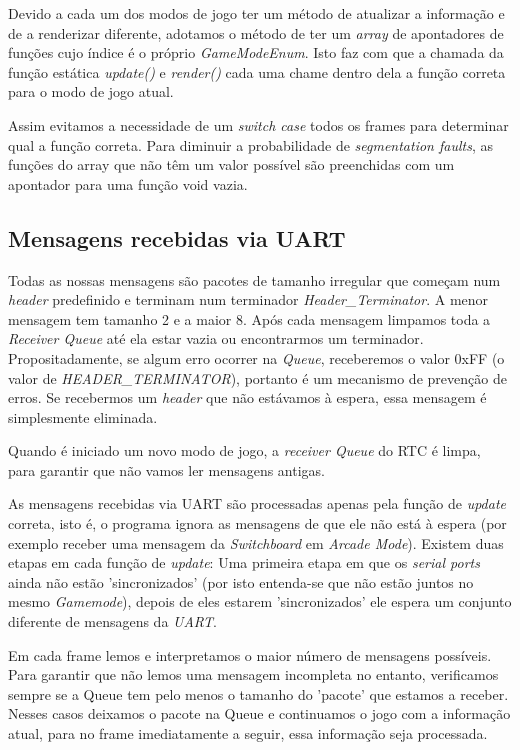 \documentclass{report}
\begin{document}
Devido a cada um dos modos de jogo ter um método de atualizar a informação e de a renderizar diferente, adotamos o método de ter um \textit{array} de apontadores de funções cujo índice é o próprio \textit{GameModeEnum}. Isto faz com que a chamada da função estática \textit{update()} e \textit{render()} cada uma chame dentro dela a função correta para o modo de jogo atual.

Assim evitamos a necessidade de um \textit{switch case} todos os frames para determinar qual a função correta. Para diminuir a probabilidade de \textit{segmentation faults}, as funções do array que não têm um valor possível são preenchidas com um apontador para uma função void vazia.

\subsection{Mensagens recebidas via UART}

Todas as nossas mensagens são pacotes de tamanho irregular que começam num \textit{header} predefinido e terminam num terminador \textit{Header\_Terminator}. A menor mensagem tem tamanho 2 e a maior 8. Após cada mensagem limpamos toda a \textit{Receiver Queue} até ela estar vazia ou encontrarmos um terminador. Propositadamente, se algum erro ocorrer na \textit{Queue}, receberemos o valor 0xFF (o valor de \textit{HEADER\_TERMINATOR}), portanto é um mecanismo de prevenção de erros. Se recebermos um \textit{header} que não estávamos à espera, essa mensagem é simplesmente eliminada.

Quando é iniciado um novo modo de jogo, a \textit{receiver Queue} do RTC é limpa, para garantir que não vamos ler mensagens antigas.

As mensagens recebidas via UART são processadas apenas pela função de \textit{update} correta, isto é, o programa ignora as mensagens de que ele não está à espera (por exemplo receber uma mensagem da \textit{Switchboard} em \textit{Arcade Mode}).
Existem duas etapas em cada função de \textit{update}: Uma primeira etapa em que os \textit{serial ports} ainda não estão 'sincronizados' (por isto entenda-se que não estão juntos no mesmo \textit{Gamemode}), depois de eles estarem 'sincronizados' ele espera um conjunto diferente de mensagens da \textit{UART}.

Em cada frame lemos e interpretamos o maior número de mensagens possíveis. Para garantir que não lemos uma mensagem incompleta no entanto, verificamos sempre se a Queue tem pelo menos o tamanho do 'pacote' que estamos a receber. Nesses casos deixamos o pacote na Queue e continuamos o jogo com a informação atual, para no frame imediatamente a seguir, essa informação seja processada.
\end{document}
